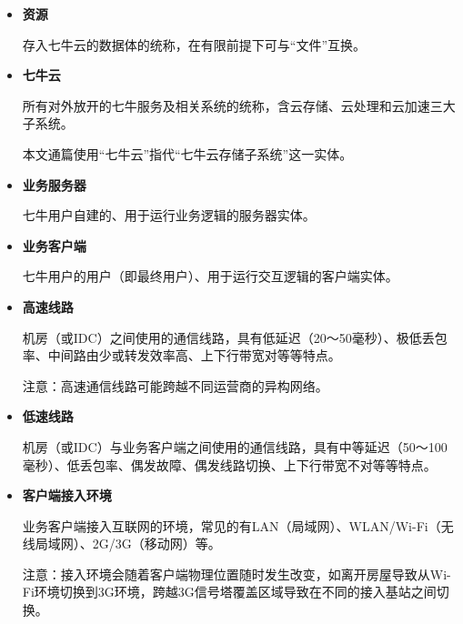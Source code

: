 \documentclass[11pt, oneside]{book}
\newcommand{\qhint}[1]{
\footnotesize
\vspace{0.2em}
\noindent
#1\par
\vspace{-0.5em}
\normalsize
}
\begin{document}
\begin{itemize}
\item {\bf 资源}\par
\qhint{存入七牛云的数据体的统称，在有限前提下可与“文件”互换。}

\item {\bf 七牛云}\par
\qhint{所有对外放开的七牛服务及相关系统的统称，含云存储、云处理和云加速三大子系统。}
\qhint{本文通篇使用“七牛云”指代“七牛云存储子系统”这一实体。}

\item {\bf 业务服务器}\par
\qhint{七牛用户自建的、用于运行业务逻辑的服务器实体。}

\item {\bf 业务客户端}\par
\qhint{七牛用户的用户（即最终用户）、用于运行交互逻辑的客户端实体。}

\item {\bf 高速线路}\par
\qhint{机房（或IDC）之间使用的通信线路，具有低延迟（20～50毫秒）、极低丢包率、中间路由少或转发效率高、上下行带宽对等等特点。}
\qhint{注意：高速通信线路可能跨越不同运营商的异构网络。}

\item {\bf 低速线路}\par
\qhint{机房（或IDC）与业务客户端之间使用的通信线路，具有中等延迟（50～100毫秒）、低丢包率、偶发故障、偶发线路切换、上下行带宽不对等等特点。}

\item {\bf 客户端接入环境}\par
\qhint{业务客户端接入互联网的环境，常见的有LAN（局域网）、WLAN/Wi-Fi（无线局域网）、2G/3G（移动网）等。}
\qhint{注意：接入环境会随着客户端物理位置随时发生改变，如离开房屋导致从Wi-Fi环境切换到3G环境，跨越3G信号塔覆盖区域导致在不同的接入基站之间切换。}
\end{itemize}
\end{document}
